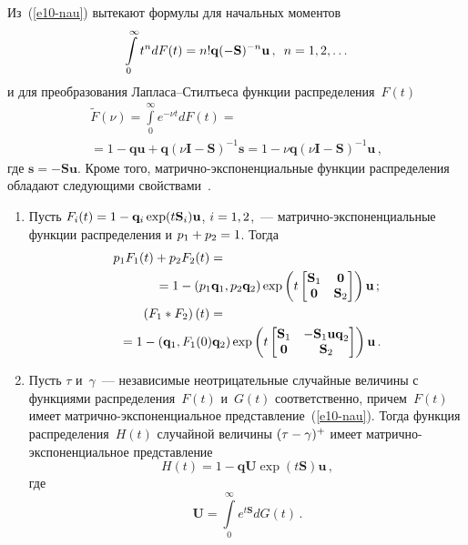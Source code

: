 \begin{multicols}{2}
  Из~(\ref{e10-nau}) вытекают формулы для начальных моментов
  \begin{equation*}
  \int\limits_0^\infty t^n dF(t)=n! \mathbf{q}(-\mathbf{S})^{-n}\mathbf{u}\,,\enskip 
n=1,2,\ldots
  \end{equation*}
и для преобразования Лап\-ла\-са--Стилть\-еса функции распределения~$F(t)$ 
\begin{multline*}
\tilde{F}(\nu)=\int\limits_0^\infty e^{-\nu t}dF(t)={}\\
{}=1-
\mathbf{q}\mathbf{u}+\mathbf{q}(\nu\mathbf{I}-\mathbf{S})^{-1} \mathbf{s}=1-
\nu\mathbf{q}(\nu\mathbf{I}-\mathbf{S})^{-1}\mathbf{u}\,,
\end{multline*}
где $\mathbf{s}=-\mathbf{Su}$. Кроме того,  
мат\-рич\-но-экс\-по\-нен\-ци\-аль\-ные функции распределения обладают 
сле\-ду\-ющи\-ми свойствами~\cite{24-nau}.
\begin{enumerate}[1.]
\item Пусть $F_i(t)=1\hm- \mathbf{q}_i\exp(t\mathbf{S}_i) \mathbf{u}$, 
$i\hm=1,2$,~--- мат\-рич\-но-экс\-по\-нен\-ци\-аль\-ные функции 
распределения и $p_1\hm+p_2\hm=1$. Тогда
\begin{align*}
p_1F_1(t)+p_2F_2(t)&={}\\
&\hspace*{-15mm}{}=1-(p_1\mathbf{q}_1, p_2\mathbf{q}_2)\exp \left( 
t\begin{bmatrix} \mathbf{S}_1 & \mathbf{0}\\
\mathbf{0}& \mathbf{S}_2\end{bmatrix}
\right) \mathbf{u}\,; %
\\
\left( F_1*F_2\right) (t) &={}\\
&\hspace*{-25mm}{}= 1-\left(\mathbf{q}_1,F_1(0) \mathbf{q}_2\right) \exp 
\left( t \begin{bmatrix}
\mathbf{S}_1 & -\mathbf{S}_1\mathbf{uq}_2\\
\mathbf{0} & \mathbf{S}_2\end{bmatrix} \right) \mathbf{u}\,.
\end{align*}
\item Пусть $\tau$ и~$\gamma$~--- независимые неотрицательные случайные 
величины с функциями распределения~$F(t)$ и~$G(t)$ соответственно, 
причем~$F(t)$ имеет  
мат\-рич\-но-экс\-по\-нен\-ци\-аль\-ное представление~(\ref{e10-nau}). Тогда 
функция распределения~$H(t)$ случайной величины  $(\tau\hm-\gamma)^+$ 
имеет  
мат\-рич\-но-экс\-по\-нен\-ци\-аль\-ное пред\-став\-ление 
\begin{equation*}
H(t)=1-\mathbf{qU}\exp (t\mathbf{S})\mathbf{u}\,,
\end{equation*}
где 
\begin{equation}
\mathbf{U}=\int\limits_0^\infty e^{t\mathbf{S}}dG(t)\,.
\label{e16-nau}
\end{equation}


\end{enumerate}
\end{multicols}
